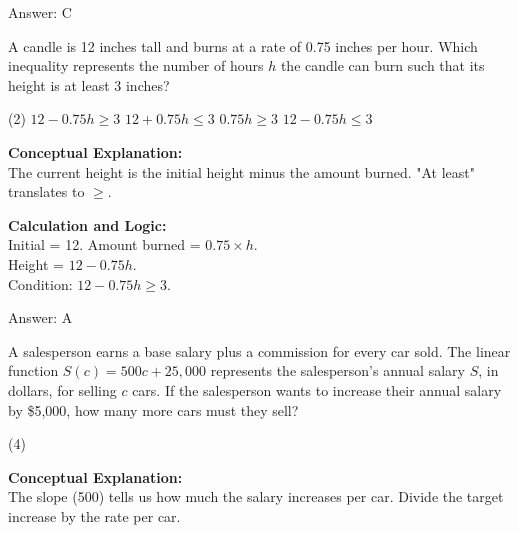 \documentclass[11pt,paper=a4,answers]{exam}
\begin{document}
\begin{questions}
\begin{solution}
\vspace{15pt}
Answer: \colorbox{yellow!100}{C}
\end{solution}

\vspace{20pt}

\question
A candle is 12 inches tall and burns at a rate of 0.75 inches per hour. Which inequality represents the number of hours $h$ the candle can burn such that its height is at least 3 inches?
\begin{tasks}(2)
    \task $12 - 0.75h \ge 3$
    \task $12 + 0.75h \le 3$
    \task $0.75h \ge 3$
    \task $12 - 0.75h \le 3$
\end{tasks}

\begin{solution}
\textbf{Conceptual Explanation:} \\
The current height is the initial height minus the amount burned. "At least" translates to $\ge$.

\vspace{10pt}
\textbf{Calculation and Logic:} \\
Initial = 12. Amount burned = $0.75 \times h$. \\
Height = $12 - 0.75h$. \\
Condition: $12 - 0.75h \ge 3$.

\vspace{15pt}
Answer: \colorbox{yellow!100}{A}
\end{solution}

\vspace{20pt}

\question
A salesperson earns a base salary plus a commission for every car sold. The linear function $S(c) = 500c + 25,000$ represents the salesperson’s annual salary $S$, in dollars, for selling $c$ cars. If the salesperson wants to increase their annual salary by \$5,000, how many more cars must they sell?
\begin{tasks}(4)
\end{tasks}

\begin{solution}
\textbf{Conceptual Explanation:} \\
The slope (500) tells us how much the salary increases per car. Divide the target increase by the rate per car.


\end{solution}
\end{questions}
\end{document}
